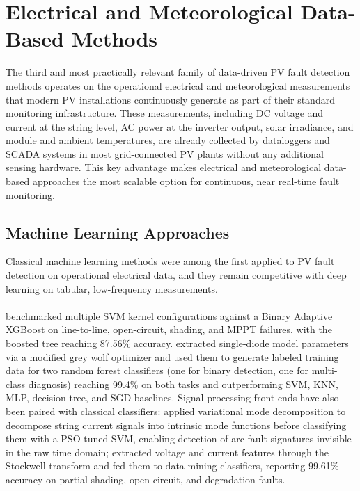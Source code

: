 \section{Electrical and Meteorological Data-Based Methods}
\label{sec:elec-meteo}

The third and most practically relevant family of data-driven PV fault detection methods operates on the operational electrical and meteorological measurements that modern PV installations continuously generate as part of their standard monitoring infrastructure. These measurements, including DC voltage and current at the string level, AC power at the inverter output, solar irradiance, and module and ambient temperatures, are already collected by dataloggers and SCADA systems in most grid-connected PV plants without any additional sensing hardware. This key advantage makes electrical and meteorological data-based approaches the most scalable option for continuous, near real-time fault monitoring.

\subsection{Machine Learning Approaches}

Classical machine learning methods were among the first applied to PV fault detection on operational electrical data, and they remain competitive with deep learning on tabular, low-frequency measurements.

\paragraph{}
\citet{suliman2024ml} benchmarked multiple SVM kernel configurations against a Binary Adaptive XGBoost on line-to-line, open-circuit, shading, and MPPT failures, with the boosted tree reaching 87.56\% accuracy. \citet{amiri2024rf} extracted single-diode model parameters via a modified grey wolf optimizer and used them to generate labeled training data for two random forest classifiers (one for binary detection, one for multi-class diagnosis) reaching 99.4\% on both tasks and outperforming SVM, KNN, MLP, decision tree, and SGD baselines. Signal processing front-ends have also been paired with classical classifiers: \citet{cai2022arc} applied variational mode decomposition to decompose string current signals into intrinsic mode functions before classifying them with a PSO-tuned SVM, enabling detection of arc fault signatures invisible in the raw time domain; \citet{saiprakash_improved_2024} extracted voltage and current features through the Stockwell transform and fed them to data mining classifiers, reporting 99.61\% accuracy on partial shading, open-circuit, and degradation faults.

